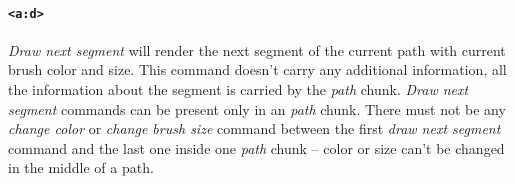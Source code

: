 \paragraph{\texttt{\textless a:d\textgreater}}
\textit{Draw next segment} will render the next segment of the current path with current brush color and size. This command doesn't carry any additional information, all the information about the segment is carried by the \textit{path} chunk. \textit{Draw next segment} commands can be present only in an \textit{path} chunk. There must not be any \textit{change color} or \textit{change brush size} command between the first \textit{draw next segment} command and the last one inside one \textit{path} chunk -- color or size can't be changed in the middle of a path.